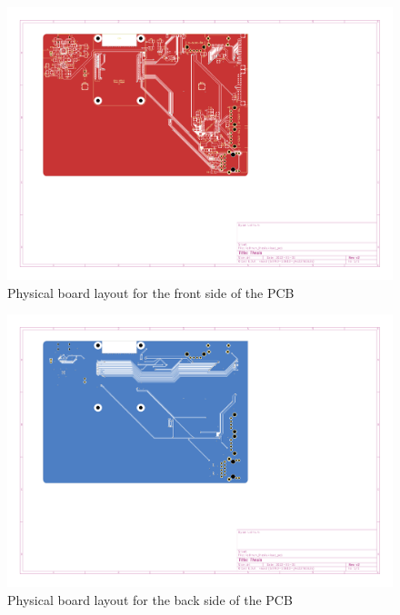 \begin{figure}[h]
  \centering
  \includegraphics[height=.91\textwidth,angle=90,page=1]{Figures/kicad/lathrum_thesis_layout_front.pdf}
  \captionsetup{width=1\linewidth}
  \caption[PCB Front Layout]{Physical board layout for the front side of the PCB}
  \label{app:pcb_layout_front}
\end{figure}

\begin{figure}[h]
  \centering
  \includegraphics[height=1\textwidth,angle=90,page=1]{Figures/kicad/lathrum_thesis_layout_back.pdf}
  \captionsetup{width=1\linewidth}
  \caption[PCB Back Layout]{Physical board layout for the back side of the PCB}
  \label{app:pcb_layout_back}
\end{figure}